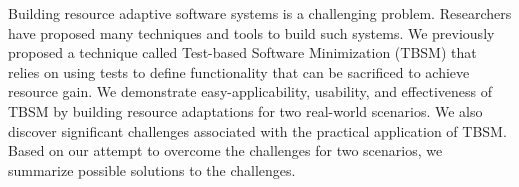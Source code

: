 Building resource adaptive software systems is a challenging problem. Researchers have proposed many techniques and tools to build such systems. We previously proposed a technique called Test-based Software Minimization (TBSM) that relies on using tests to define functionality that can be sacrificed to achieve resource gain. We demonstrate easy-applicability, usability, and effectiveness of TBSM by building resource adaptations for two real-world scenarios. We also discover significant challenges associated with the practical application of TBSM. Based on our attempt to overcome the challenges for two scenarios, we summarize possible solutions to the challenges. 
